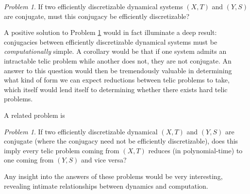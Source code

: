 \documentclass{amsart}
\theoremstyle{theorem}
\theoremstyle{remark}
\newtheorem{problem}[theorem]{Problem}
\numberwithin{equation}{section}
\begin{document}
\begin{problem}\label{probEfficientConj}
If two efficiently discretizable dynamical systems $(X, T)$ and $(Y, S)$ are conjugate, must this conjugacy be efficiently discretizable?
\end{problem}

A positive solution to Problem \ref{probEfficientConj} would in fact illuminate a deep result: conjugacies between efficiently discretizable dynamical systems must be \emph{computationally} simple. A corollary would be that if one system admits an intractable telic problem while another does not, they are not conjugate.
An answer to this question would then be tremendously valuable in determining what kind of form we can expect reductions between telic problems to take, which itself would lend itself to determining whether there exists hard telic problems.

A related problem is

\begin{problem}
If two efficiently discretizable dynamical $(X, T)$ and $(Y, S)$ are conjugate (where the conjugacy need not be efficiently discretizable), does this imply every telic problem coming from $(X, T)$ reduces (in polynomial-time) to one coming from $(Y, S)$ and vice versa?
\end{problem}

Any insight into the answers of these problems would be very interesting, revealing intimate relationships between dynamics and computation.






\end{document}

